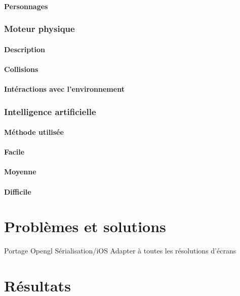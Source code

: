\documentclass[a4paper,11pt]{report}
\begin{document}
			\subsubsection{Personnages}
			
		\subsection{Moteur physique}
		
			\subsubsection{Description}
		
			\subsubsection{Collisions}
			
			\subsubsection{Intéractions avec l'environnement}
			
		\subsection{Intelligence artificielle}

			\subsubsection{Méthode utilisée}
			
			\subsubsection{Facile}
			
			\subsubsection{Moyenne}
			
			\subsubsection{Difficile}

\chapter{Problèmes et solutions}

	Portage 
		 Opengl
		 Sérialisation/iOS
		 Adapter à toutes les résolutions d'écrans

\chapter{Résultats}
\end{document}
